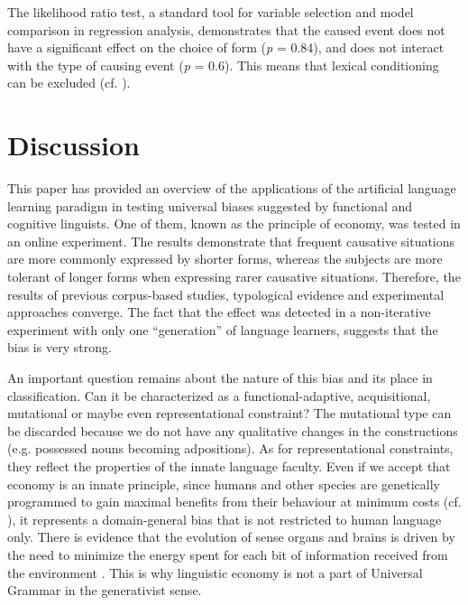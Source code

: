 \documentclass[output=paper]{langsci/langscibook}
\begin{document}
The likelihood ratio test, a standard tool for variable selection and model comparison in regression analysis, demonstrates that the caused event does not have a significant effect on the choice of form (\textit{p} = 0.84), and does not interact with the type of causing event (\textit{p} = 0.6). This means that lexical conditioning can be excluded (cf. \citealt{SmithWonnacott2010}). 

\section{Discussion}

This paper has provided an overview of the applications of the artificial language learning paradigm in testing universal biases suggested by functional and cognitive linguists. One of them, known as the principle of economy, was tested in an online experiment. The results demonstrate that frequent causative situations are more commonly expressed by shorter forms, whereas the subjects are more tolerant of longer forms when expressing rarer causative situations. Therefore, the results of previous corpus-based studies, typological evidence and experimental approaches converge. The fact that the effect was detected in a non-iterative experiment with only one “generation” of language learners, suggests that the bias is very strong.

An important question remains about the nature of this bias and its place in  classification. Can it be characterized as a functional-adaptive, acquisitional, mutational or maybe even representational constraint? The mutational type can be discarded because we do not have any qualitative changes in the constructions (e.g. possessed nouns becoming adpositions). As for representational constraints, they reflect the properties of the innate language faculty. Even if we accept that economy is an innate principle, since humans and other species are genetically programmed to gain maximal benefits from their behaviour at minimum costs (cf. \citealt{ParkerSmith1990}), it represents a domain-general bias that is not restricted to human language only. There is evidence that the evolution of sense organs and brains is driven by the need to minimize the energy spent for each bit of information received from the environment \citep[3]{Stone2015}. This is why linguistic economy is not a part of Universal Grammar in the generativist sense. 
\end{document}
